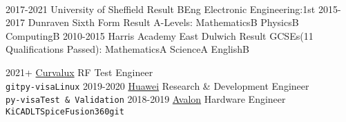 \documentclass[9pt]{developercv} %
\begin{document}
\vspace{0.5cm}


\begin{minipage}[t]{0.35\textwidth}%

	\vspace{0.1cm} %
	\lorem \lorem \lorem \lorem \lorem\\ %
\end{minipage}
\hfill
\begin{minipage}[t]{0.60\textwidth}

	\vspace{0.1cm} %
	\halfentry
		{2017-2021}
		{University of Sheffield}
		{Result}
		{BEng Electronic Engineering:\hfill1st}
	\halfentry
		{2015-2017}
		{Dunraven Sixth Form}
		{Result}
		{
			A-Levels:\newline
			Mathematics\hfill B\newline
			Physics\hfill B\newline
			Computing\hfill B\newline
		}
	\halfentry
		{2010-2015}
		{Harris Academy East Dulwich}
		{Result}
		{
			GCSEs(11 Qualifications Passed):\newline
			Mathematics\hfill A\newline
			Science\hfill A\newline
			English\hfill B\newline
		}
\end{minipage}




\begin{entrylist}
	\entry
		{2021+}
		{\href{https://Curvalux.com}{Curvalux}}
		{RF Test Engineer}
		{\lorem \lorem \lorem\\ \texttt{git}\slashsep\texttt{py-visa}\slashsep\texttt{Linux}}
	\entry
		{2019-2020}
		{\href{https://www.huawei.com/uk/contact-us}{Huawei}}
		{Research \& Development Engineer}
		{\lorem\lorem\\ \texttt{py-visa}\slashsep\texttt{Test \& Validation}}
	\entry
		{2018-2019}
		{\href{https://avalonrov.wixsite.com/avalonrov}{Avalon}}
		{Hardware Engineer}
		{\lorem\lorem\\ \texttt{KiCAD}\slashsep\texttt{LTSpice}\slashsep\texttt{Fusion360}\slashsep\texttt{git}}
\end{entrylist}
\end{document}
